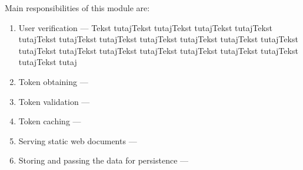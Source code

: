 Main responsibilities of this module are:
\begin{enumerate}
    \item User verification --- Tekst tutajTekst tutajTekst tutajTekst tutajTekst tutajTekst tutajTekst tutajTekst tutajTekst tutajTekst tutajTekst tutajTekst tutajTekst tutajTekst tutajTekst tutajTekst tutajTekst tutajTekst tutajTekst tutajTekst tutaj 
    \\ \vspace{-7mm}
    \item Token obtaining --- 
    \\ \vspace{-7mm}
    \item Token validation --- 
    \\ \vspace{-7mm}
    \item Token caching --- 
    \\ \vspace{-7mm}
    \item Serving static web documents --- 
    \\ \vspace{-7mm}
    \item Storing and passing the data for persistence --- \\
\end{enumerate}


